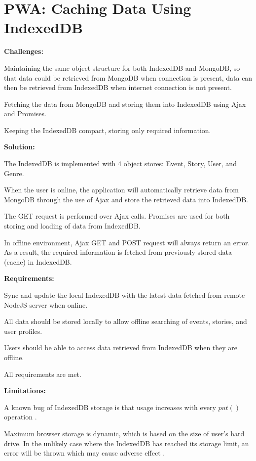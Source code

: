 \documentclass[11pt, a4paper]{article}
\begin{document}
\section{PWA: Caching Data Using IndexedDB}
\textbf{Challenges:}
\begin{enumerate*}[label=\textbf{\arabic*})]
\item Maintaining the same object structure for both IndexedDB and MongoDB, so that data could be
retrieved from MongoDB when connection is present, data can then be retrieved from IndexedDB when
internet connection is not present.
\item Fetching the data from MongoDB and storing them into IndexedDB using Ajax and Promises.
\item Keeping the IndexedDB compact, storing only required information.
\end{enumerate*}
%
\textbf{Solution:}
\begin{enumerate*}[label=\textbf{\arabic*})]
\item The IndexedDB is implemented with 4 object stores: Event, Story, User, and Genre.
\item When the user is online, the application will automatically retrieve data from MongoDB through
the use of Ajax and store the retrieved data into IndexedDB.
\item The GET request is performed over Ajax calls. Promises are used for both storing and loading
of data from IndexedDB.
\item In offline environment, Ajax GET and POST request will always return an error. As a result,
the required information is fetched from previously stored data (cache) in IndexedDB.
\end{enumerate*}
%
\textbf{Requirements:}
\begin{enumerate*}[label=\textbf{\arabic*})]
\item Sync and update the local IndexedDB with the latest data fetched from remote NodeJS server
when online.
\item All data should be stored locally to allow offline searching of events, stories, and user
profiles.
\item Users should be able to access data retrieved from IndexedDB when they are offline.
\item All requirements are met.
\end{enumerate*}
%
\textbf{Limitations:}
\begin{enumerate*}[label=\textbf{\arabic*})]
\item A known bug of IndexedDB storage is that usage increases with every $put()$ operation
\cite{leveldb_593, leveldb_603}.
\item Maximum browser storage is dynamic, which is based on the size of user's hard drive. In
the unlikely case where the IndexedDB has reached its storage limit, an error will be thrown
which may cause adverse effect \cite{browser_storage_limit}.
\end{enumerate*}
\end{document}
